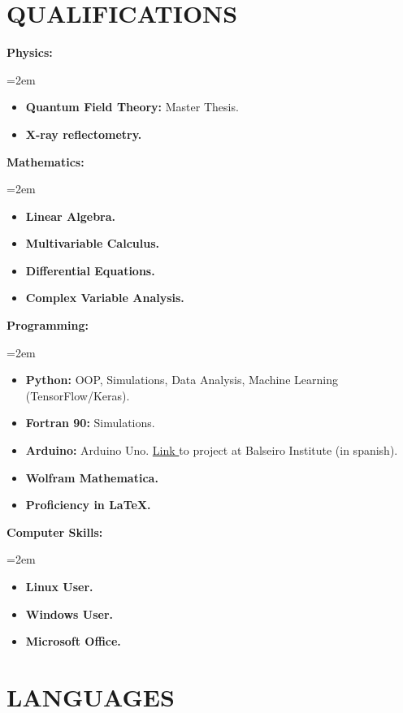 \documentclass[paper=letter,fontsize=11pt]{scrartcl} %
\newcommand{\sepspace}{\vspace*{1em}}		%
\newcommand{\NewPart}[2]{\section*{\uppercase{#1} \small \normalfont #2}}
\newcommand{\WorkEntry}[5]{
		\noindent \textbf{#1}
        \noindent \small \textit{#2}
        \hfill      %
        \colorbox{White}{%
			\parbox{6em}{%
			\hfill\color{Black}#3}} \par  %
		\noindent \textit{#4} \par        %
		\noindent\hangindent=2em\hangafter=0 \small #5 %
		\normalsize \par}
\begin{document}
\NewPart{QUALIFICATIONS}{}



\sepspace

\WorkEntry{Physics:}{}{}{}{
\begin{itemize}
\item \textbf{Quantum Field Theory:} Master Thesis.
\item \textbf{X-ray reflectometry.} 
\end{itemize}
}

\sepspace

\WorkEntry{Mathematics:}{}{}{}{
\begin{itemize}
\item \textbf{Linear Algebra.}
\item \textbf{Multivariable Calculus.}
\item \textbf{Differential Equations.}
\item \textbf{Complex Variable Analysis.} 
\end{itemize}
}

\sepspace

\WorkEntry{Programming:}{}{}{}{
\begin{itemize}
\item \textbf{Python:} OOP, Simulations, Data Analysis, Machine Learning (TensorFlow/Keras).
\item \textbf{Fortran 90:} Simulations.
\item \textbf{Arduino:} Arduino Uno. {\href{https://drive.google.com/drive/folders/1y01BjDnIPS2QOX3Vo68r9A8HA9tstj1S}{Link }} to project at Balseiro Institute (in spanish).
\item \textbf{Wolfram Mathematica.} 
\item \textbf{Proficiency in LaTeX.}
\end{itemize}
}

\sepspace

\WorkEntry{Computer Skills:}{}{}{}{
\begin{itemize}
\item \textbf{Linux User.}
\item \textbf{Windows User.}
\item \textbf{Microsoft Office.}
\end{itemize}
}

\sepspace

\NewPart{LANGUAGES}{}
\end{document}
